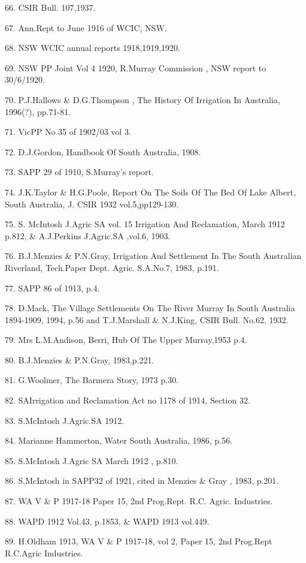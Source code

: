 66. CSIR Bull. 107,1937.

67. Ann.Rept to June 1916 of WCIC, NSW. 

68. NSW WCIC annual reports 1918,1919,1920.

69. NSW PP Joint Vol 4 1920, R.Murray Commission , NSW 
      report to 30/6/1920.

70. P.J.Hallows \& D.G.Thompson , The History Of Irrigation In
      Australia, 1996(?), pp.71-81.

71. VicPP No 35 of 1902/03 vol 3.

72. D.J.Gordon, Handbook Of South Australia, 1908. 

73. SAPP 29 of 1910, S.Murray's report.

74. J.K.Taylor \& H.G.Poole, Report On The Soils Of The Bed Of Lake 
      Albert, South Australia, J. CSIR 1932 vol.5,pp129-130.

75. S. McIntosh J.Agric SA vol. 15 Irrigation And Reclamation, March 1912 
      p.812, \& A.J.Perkins J.Agric.SA ,vol.6, 1903.

76. B.J.Menzies \& P.N.Gray, Irrigation And Settlement In The South 
      Australian Riverland, Tech.Paper Dept. Agric. S.A.No.7, 1983, p.191.

77. SAPP 86 of 1913, p.4. 

78. D.Mack, The Village Settlements On The River Murray In South Australia 
      1894-1909, 1994,  p.56 and T.J.Marshall \& N.J.King, CSIR Bull. No.62,
      1932.

79. Mrs L.M.Andison, Berri, Hub Of The Upper Murray,1953 p.4.

80. B.J.Menzies \& P.N.Gray, 1983,p.221.

81. G.Woolmer, The Barmera Story, 1973 p.30.

82. SAIrrigation and Reclamation Act no 1178 of 1914, Section 32. 

83. S.McIntosh J.Agric.SA 1912. 

84. Marianne Hammerton, Water South Australia, 1986, p.56.

85. S.McIntosh J.Agric SA March 1912 , p.810.

86. S.McIntosh in SAPP32 of 1921, cited in Menzies \& Gray , 1983, p.201.

87. WA V \& P 1917-18 Paper 15, 2nd Prog.Rept. R.C. Agric. Industries.

88. WAPD 1912 Vol.43, p.1853, \& WAPD 1913 vol.449.

89. H.Oldham 1913, WA V \& P 1917-18, vol 2, Paper 15, 2nd Prog.Rept 
      R.C.Agric Industries.

